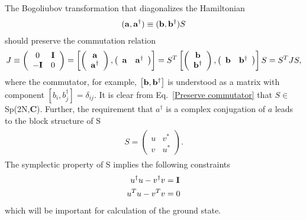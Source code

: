 The Bogoliubov transformation that diagonalizes the Hamiltonian
\begin{eqnarray}\begin{aligned}
\label{Def. of a}
({\bf a} , {\bf a}^\dagger)\equiv({\bf b} , {\bf b}^\dagger)S
\end{aligned}\end{eqnarray}
should preserve the commutation relation
\begin{eqnarray}\begin{aligned}
\label{Preserve commutator}
J\equiv\left(\begin{array}{ccc}
0 & {\bf I}\\
-{\bf I} & 0
\end{array}\right)
=\left[
\left(\begin{array}{ccc}
{\bf a} \\
{\bf a}^\dagger
\end{array}\right),
\left(\begin{array}{ccc}
{\bf a} & {\bf a}^\dagger
\end{array}\right)\right]
=S^T\left[
\left(\begin{array}{ccc}
{\bf b} \\
{\bf b}^\dagger
\end{array}\right),
\left(\begin{array}{ccc}
{\bf b} & {\bf b}^\dagger
\end{array}\right)\right]S
=S^T JS,
\end{aligned}\end{eqnarray}
where the commutator, for example, $\left[{\bf b},{\bf b}^\dagger\right]$ is understood as a matrix with component $\left[b_i,b_j^\dagger\right]=\delta_{ij}$. It is clear from Eq.~\eqref{Preserve commutator} that $S\in$Sp(2N,{\bf C})\cite{fulton_representation_2004}. Further, the requirement that $a^\dagger$ is a complex conjugation of $a$ leads to the block structure of S
\begin{eqnarray}\begin{aligned}
\label{Block of S}
S=\left(\begin{array}{ccc}
u & v^*\\
v & u^*
\end{array}\right).
\end{aligned}\end{eqnarray}
The symplectic property of S implies the following constraints 
\begin{eqnarray}
u^\dagger u-v^\dagger v&={\bf I}\label{Constraint 1}\\
u^T u-v^T v&=0\label{Constraint 2}
\end{eqnarray}
which will be important for calculation of the ground state. 

